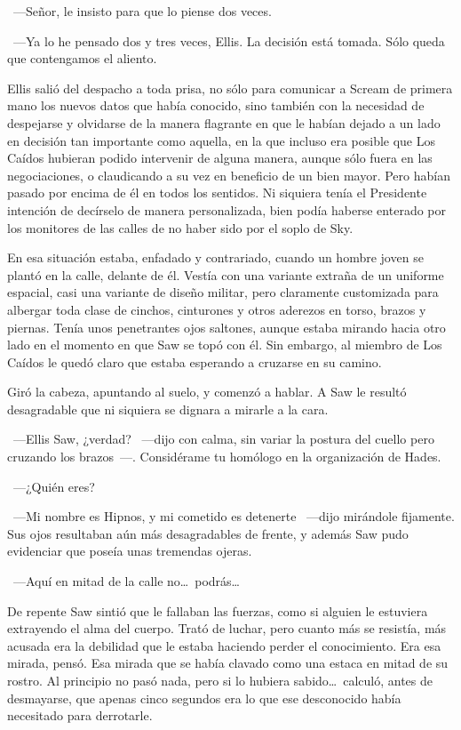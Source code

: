 ~---Señor, le insisto para que lo piense dos veces.

~---Ya lo he pensado dos y tres veces, Ellis. La decisión está tomada. Sólo queda que contengamos el aliento.

\parbreak
Ellis salió del despacho a toda prisa, no sólo para comunicar a Scream de primera mano los nuevos datos que había conocido, sino también con la necesidad de despejarse y olvidarse de la manera flagrante en que le habían dejado a un lado en decisión tan importante como aquella, en la que incluso era posible que Los Caídos hubieran podido intervenir de alguna manera, aunque sólo fuera en las negociaciones, o claudicando a su vez en beneficio de un bien mayor. Pero habían pasado por encima de él en todos los sentidos. Ni siquiera tenía el Presidente intención de decírselo de manera personalizada, bien podía haberse enterado por los monitores de las calles de no haber sido por el soplo de Sky.

En esa situación estaba, enfadado y contrariado, cuando un hombre joven se plantó en la calle, delante de él. Vestía con una variante extraña de un uniforme espacial, casi una variante de diseño militar, pero claramente customizada para albergar toda clase de cinchos, cinturones y otros aderezos en torso, brazos y piernas. Tenía unos penetrantes ojos saltones, aunque estaba mirando hacia otro lado en el momento en que Saw se topó con él. Sin embargo, al miembro de Los Caídos le quedó claro que estaba esperando a cruzarse en su camino.

Giró la cabeza, apuntando al suelo, y comenzó a hablar. A Saw le resultó desagradable que ni siquiera se dignara a mirarle a la cara.

~---Ellis Saw, ¿verdad? ~---dijo con calma, sin variar la postura del cuello pero cruzando los brazos~---. Considérame tu homólogo en la organización de Hades.

~---¿Quién eres?

~---Mi nombre es Hipnos, y mi cometido es detenerte ~---dijo mirándole fijamente. Sus ojos resultaban aún más desagradables de frente, y además Saw pudo evidenciar que poseía unas tremendas ojeras.

~---Aquí en mitad de la calle no\dots\ podrás\dots

De repente Saw sintió que le fallaban las fuerzas, como si alguien le estuviera extrayendo el alma del cuerpo. Trató de luchar, pero cuanto más se resistía, más acusada era la debilidad que le estaba haciendo perder el conocimiento. Era esa mirada, pensó. Esa mirada que se había clavado como una estaca en mitad de su rostro. Al principio no pasó nada, pero si lo hubiera sabido\dots\ calculó, antes de desmayarse, que apenas cinco segundos era lo que ese desconocido había necesitado para derrotarle.

